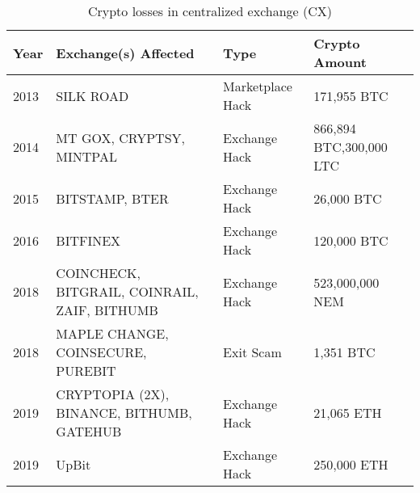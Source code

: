 \documentclass{article}
\begin{document}
%
\begin{table}[!hbt]
  \centering\renewcommand{\arraystretch}{1.2}
 \caption{Crypto losses in centralized exchange (CX)}
  \centering
\begin{tabular}{@{}llll@{}}
\toprule
Year & Exchange(s) Affected                         & Type             & Crypto Amount           \\ \midrule
2013 & SILK ROAD                                    & Marketplace Hack & 171,955 BTC             \\
2014 & MT GOX, CRYPTSY, MINTPAL                     & Exchange Hack    & 866,894 BTC,300,000 LTC \\
2015 & BITSTAMP, BTER                               & Exchange Hack    & 26,000 BTC              \\
2016 & BITFINEX                                     & Exchange Hack    & 120,000 BTC             \\
2018 & COINCHECK, BITGRAIL, COINRAIL, ZAIF, BITHUMB & Exchange Hack    & 523,000,000 NEM         \\
2018 & MAPLE CHANGE, COINSECURE, PUREBIT            & Exit Scam        & 1,351 BTC               \\
2019 & CRYPTOPIA (2X), BINANCE, BITHUMB, GATEHUB    & Exchange Hack    & 21,065 ETH              \\
2019 & UpBit                                        & Exchange Hack    & 250,000 ETH             \\ \bottomrule
\end{tabular}
\end{table}
\end{document}

